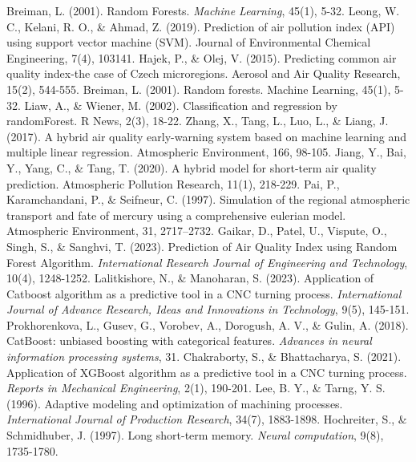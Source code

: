 \documentclass{book}
\numberwithin{equation}{section}
\numberwithin{figure}{section}
\begin{document}
\begin{thebibliography}{99}
    Breiman, L. (2001). Random Forests. \textit{Machine Learning}, 45(1), 5-32.
    Leong, W. C., Kelani, R. O., \& Ahmad, Z. (2019). Prediction of air pollution index (API) using support vector machine (SVM). Journal of Environmental Chemical Engineering, 7(4), 103141.
    Hajek, P., \& Olej, V. (2015). Predicting common air quality index-the case of Czech microregions. Aerosol and Air Quality Research, 15(2), 544-555.
    Breiman, L. (2001). Random forests. Machine Learning, 45(1), 5-32.
    Liaw, A., \& Wiener, M. (2002). Classification and regression by randomForest. R News, 2(3), 18-22.
    Zhang, X., Tang, L., Luo, L., \& Liang, J. (2017). A hybrid air quality early-warning system based on machine learning and multiple linear regression. Atmospheric Environment, 166, 98-105.
    Jiang, Y., Bai, Y., Yang, C., \& Tang, T. (2020). A hybrid model for short-term air quality prediction. Atmospheric Pollution Research, 11(1), 218-229.
    Pai, P., Karamchandani, P., \& Seifneur, C. (1997). Simulation of the regional atmospheric transport and fate of mercury using a comprehensive eulerian model. Atmospheric Environment, 31, 2717–2732.
    Gaikar, D., Patel, U., Vispute, O., Singh, S., \& Sanghvi, T. (2023). Prediction of Air Quality Index using Random Forest Algorithm. \textit{International Research Journal of Engineering and Technology}, 10(4), 1248-1252.
    Lalitkishore, N., \& Manoharan, S. (2023). Application of Catboost algorithm as a predictive tool in a CNC turning process. \textit{International Journal of Advance Research, Ideas and Innovations in Technology}, 9(5), 145-151.
    Prokhorenkova, L., Gusev, G., Vorobev, A., Dorogush, A. V., \& Gulin, A. (2018). CatBoost: unbiased boosting with categorical features. \textit{Advances in neural information processing systems}, 31.
    Chakraborty, S., \& Bhattacharya, S. (2021). Application of XGBoost algorithm as a predictive tool in a CNC turning process. \textit{Reports in Mechanical Engineering}, 2(1), 190-201.
    Lee, B. Y., \& Tarng, Y. S. (1996). Adaptive modeling and optimization of machining processes.  \textit{International Journal of Production Research}, 34(7), 1883-1898.
    Hochreiter, S., \& Schmidhuber, J. (1997). Long short-term memory. \textit{Neural computation}, 9(8), 1735-1780.

\end{thebibliography}
\end{document}
